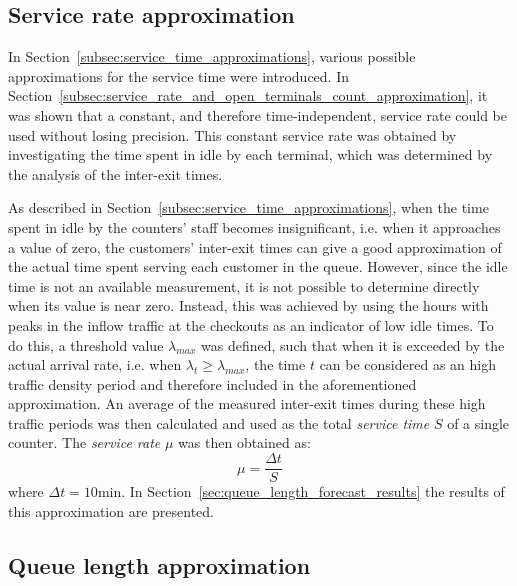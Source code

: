 \subsection{Service rate approximation}
\label{subsec:service_rate_approximation}

In Section~\ref{subsec:service_time_approximations}, various possible approximations for the service time were introduced. In Section~\ref{subsec:service_rate_and_open_terminals_count_approximation}, it was shown that a constant, and therefore time-independent, service rate could be used without losing precision. This constant service rate was obtained by investigating the time spent in idle by each terminal, which was determined by the analysis of the inter-exit times.

As described in Section~\ref{subsec:service_time_approximations}, when the time spent in idle by the counters’ staff becomes insignificant, i.e. when it approaches a value of zero, the customers’ inter-exit times can give a good approximation of the actual time spent serving each customer in the queue. However, since the idle time is not an available measurement, it is not possible to determine directly when its value is near zero. Instead, this was achieved by using the hours with peaks in the inflow traffic at the checkouts as an indicator of low idle times. To do this, a threshold value \( \lambda_{max} \) was defined, such that when it is exceeded by the actual arrival rate, i.e. when \( \lambda_t \ge \lambda_{max} \), the time \( t \) can be considered as an high traffic density period and therefore included in the aforementioned approximation. An average of the measured inter-exit times during these high traffic periods was then calculated and used as the total \emph{service time} \( S \) of a single counter. The \emph{service rate} \( \mu \) was then obtained as:
\begin{equation}
  \mu = \frac{\Delta t}{S}
\end{equation}
where \( \Delta t = 10\text{min} \). In Section~\ref{sec:queue_length_forecast_results} the results of this approximation are presented.

\subsection{Queue length approximation}
\label{subsec:queue_length_approximation}

